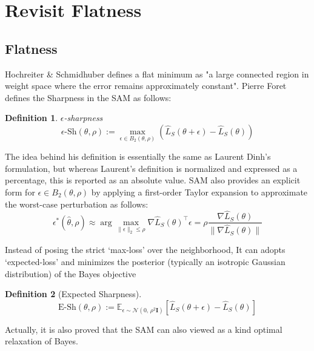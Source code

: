 \documentclass[letterpaper]{article} %
\newtheorem{definition}{Definition}
\begin{document}
\section{Revisit Flatness}


\subsection{Flatness}

Hochreiter \& Schmidhuber\citep{FlatMinima1997} defines a flat minimum as "a large connected region in weight space where the error remains approximately constant". Pierre Foret defines the Sharpness in the SAM as follows: 

\begin{definition} $\epsilon$-sharpness \label{SAM sharpness}
\begin{equation} 
   \epsilon\text{-Sh}(\theta,\rho):= \max _{\epsilon \in B_2(\theta, \rho)}\left(\widehat{L}_S\left(\theta+\epsilon\right)-\widehat{L}_S(\theta)\right)
\end{equation}
\end{definition}
The idea behind his definition is essentially the same as Laurent Dinh’s formulation, but whereas Laurent’s definition is normalized and expressed as a percentage, this is reported as an absolute value. SAM also provides an explicit form for $\epsilon \in B_2(\theta, \rho)$ by applying a first-order Taylor expansion to approximate the worst-case perturbation as follows:
\begin{equation}
    \epsilon^*(\hat{\theta},\rho) 
    \approx  \arg\max_{\|\epsilon\|_2 \leq \rho}\nabla \hat{L}_S(\theta)^\top \epsilon = \rho \frac{\nabla \hat{L}_S(\theta)}{\|\nabla \widehat{L}_S(\theta)\|}
\end{equation}

Instead of posing the strict ‘max-loss’ over the neighborhood, It can adopts ‘expected-loss’ and minimizes the posterior (typically an isotropic Gaussian distribution) of the  Bayes objective \cite{bislaLowPassFilteringSGD2022,liRevisitingRandomWeight2024}
 \begin{definition}[Expected Sharpness]\label{def: Task-Aware Expected Sharpness}
 \begin{equation}
 \text{E-Sh}(\theta,\rho) := \mathbb{E}_{\epsilon \sim \mathcal{N}(0,\, \rho^2 \mathbf{I})}  \left[ \hat{L}_{S}(\theta + \epsilon) - \hat{L}_{S}(\theta) \right] 
 \end{equation}
 \end{definition}
 Actually, it is also proved that the SAM can also viewed as a kind optimal relaxation of Bayes\cite{mollenhoffSAMOptimalRelaxation2022}.
\end{document}
